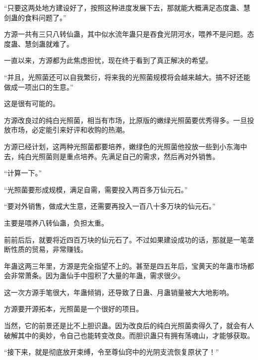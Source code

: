 \begin{this_body}
“只要这两处地方建设好了，按照这种进度发展下去，那就能大概满足态度蛊、慧剑蛊的食料问题了。”

方源一共有三只八转仙蛊，其中似水流年蛊只是吞食光阴河水，喂养不是问题。态度蛊、慧剑蛊就难了。

一直以来，方源都为此焦虑担忧，现在终于看到了真正解决的希望。

“并且，光照菌还可以自我繁衍，将来我的光照菌规模将会越来越大。搞不好还能做成一项出口的生意。”

这是很有可能的。

方源改良过的纯白光照菌，相当有市场，比原版的嫩绿光照菌要优秀得多。一旦投放市场，必定能引来好评和收购的热潮。

方源已经计划，这两种光照菌都要培养，嫩绿色的光照菌他投放一些到小东海中去，纯白光照菌则是重点培养。先满足自己的需求，然后再对外销售。

“计算一下。”

“光照菌要形成规模，满足自需，需要投入两百多万仙元石。”

“要对外销售，做成大生意，还需要再投入一百八十多万块的仙元石。”

主要是喂养八转仙蛊，负担太重。

前前后后，就要将近四百万块的仙元石了。不过如果建设成功的话，那就是一笔垄断性质的贸易，非常赚钱。

年蛊这两三年里，方源是完全指望不上的。甚至是四五年后，宝黄天的年蛊市场都会非常萧条。因为蛊仙手中囤积了大量的年蛊，需求很少。

这一次方源手笔很大，年蛊倾销，还导致了日蛊、月蛊销量被大大地影响。

方源要开源拓本，光照菌是一个很好的项目。

当然，它的前景还是比不上胆识蛊。因为改良后的纯白光照菌卖得久了，就会有人破解其中的奥妙，令自己也能转变改良。而胆识蛊只有拥有荡魂山，才能够获取。

“接下来，就是彻底放开束缚，令至尊仙窍中的光阴支流恢复原状了！”

\end{this_body}

